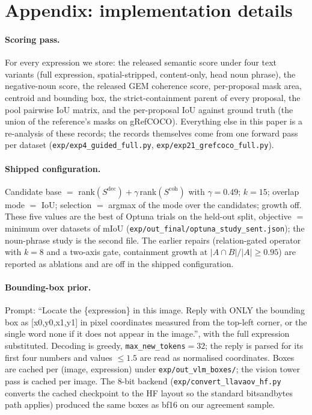 \section{Appendix: implementation details}
\label{app:impl}

\paragraph{Scoring pass.}
For every expression we store: the released semantic score under four text
variants (full expression, spatial-stripped, content-only, head noun phrase),
the negative-noun score, the released GEM coherence score, per-proposal mask
area, centroid and bounding box, the strict-containment parent of every
proposal, the pool pairwise IoU matrix, and the per-proposal IoU against
ground truth (the union of the reference's masks on gRefCOCO). Everything
else in this paper is a re-analysis of these records; the records themselves
come from one forward pass per dataset
(\texttt{exp/exp4\_guided\_full.py}, \texttt{exp/exp21\_grefcoco\_full.py}).

\paragraph{Shipped configuration.}
Candidate base $=$ rank$(S^{\mathrm{dec}})+\gamma\,$rank$(S^{\mathrm{coh}})$
with $\gamma=0.49$; $k=15$; overlap mode $=$ IoU; selection $=$ argmax of the
mode over the candidates; growth off. These five values are the best of
\studyTrials{} Optuna trials on the held-out split, objective $=$ minimum over
datasets of mIoU (\texttt{exp/out\_final/optuna\_study\_sent.json}); the
noun-phrase study is the second file. The earlier repairs (relation-gated
operator with $k=8$ and a two-axis gate, containment growth at
$|A\cap B|/|A|\ge0.95$) are reported as ablations and are off in the shipped
configuration.

\paragraph{Bounding-box prior.}
Prompt: ``Locate the \{expression\} in this image. Reply with ONLY the
bounding box as [x0,y0,x1,y1] in pixel coordinates measured from the
top-left corner, or the single word none if it does not appear in the
image.'', with the full expression substituted. Decoding is greedy,
\texttt{max\_new\_tokens}{}$=32$; the reply is parsed for its first four
numbers and values $\le1.5$ are read as normalised coordinates. Boxes are
cached per (image, expression) under \texttt{exp/out\_vlm\_boxes/}; the
vision tower pass is cached per image. The 8-bit backend
(\texttt{exp/convert\_llavaov\_hf.py} converts the cached checkpoint to the
HF layout so the standard bitsandbytes path applies) produced the same boxes
as bf16 on our agreement sample.


